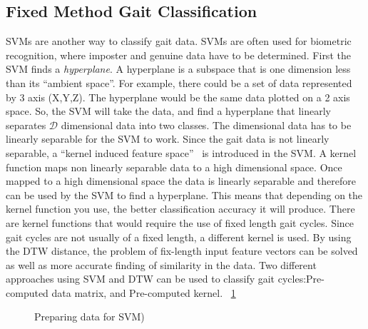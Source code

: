 \documentclass{sig-alternate}
\begin{document}
\subsection{Fixed Method Gait Classification}\label{FMGC}
	SVMs are another way to classify gait data. SVMs are often used for biometric recognition, where imposter and genuine data have to be determined. First the SVM finds a \textit{hyperplane}. A hyperplane is a subspace that is one dimension less than its ``ambient space''. For example, there could be a set of data represented by 3 axis (X,Y,Z). The hyperplane would be the same data plotted on a 2 axis space. So, the SVM will take the data, and find a hyperplane that linearly separates \begin{math}\mathcal{D} \end{math} dimensional data into two classes. The dimensional data has to be linearly separable for the SVM to work. Since the gait data is not linearly separable, a ``kernel induced feature space''~\cite{Muaaz:2013} is introduced in the SVM. A kernel function maps non linearly separable data to a high dimensional space. Once mapped to a high dimensional space the data is linearly separable and therefore can be used by the SVM to find a hyperplane. This means that depending on the kernel function you use, the better classification accuracy it will produce. 
There are kernel functions that would require the use of fixed length gait cycles. Since gait cycles are not usually of a fixed length, a different kernel is used. By using the DTW distance, the problem of fix-length input feature vectors can be solved as well as more accurate finding of similarity in the data. Two different approaches using SVM and DTW can be used to classify gait cycles:Pre-computed data matrix, and Pre-computed kernel. ~\ref{fig:TrainingData}
	

\begin{figure}
\centering
{}
\caption{Preparing data for SVM)}
\label{fig:TrainingData}
\end{figure}

	
\end{document}
